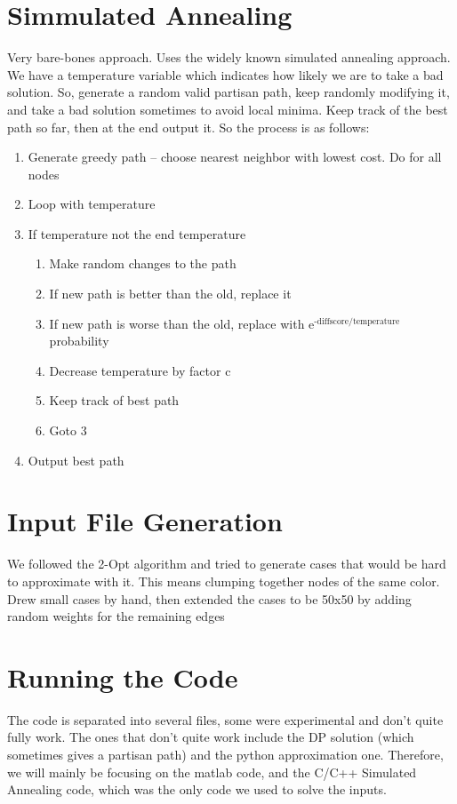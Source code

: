 \documentclass[11pt]{article}
\begin{document}
\section{Simmulated Annealing}
\label{sec-3}
Very bare-bones approach. Uses the widely known simulated annealing approach. We
have a temperature variable which indicates how likely we are to take a bad solution.
So, generate a random valid partisan path, keep randomly modifying it, and take a bad
solution sometimes to avoid local minima. Keep track of the best path so far, then at the
end output it. So the process is as follows:\\
\begin{enumerate}
\item Generate greedy path -- choose nearest neighbor with lowest cost. Do for all nodes
\item Loop with temperature
\item If temperature not the end temperature
\begin{enumerate}
\item Make random changes to the path
\item If new path is better than the old, replace it
\item If new path is worse than the old, replace with e$^{\text{-diffscore/temperature}}$ probability
\item Decrease temperature by factor c
\item Keep track of best path
\item Goto 3
\end{enumerate}
\item Output best path
\end{enumerate}

\newpage

\section{Input File Generation}
\label{sec-4}
We followed the 2-Opt algorithm and tried to generate cases
that would be hard to approximate with it. This means clumping together
nodes of the same color. Drew small cases by hand, then extended the cases
to be 50x50 by adding random weights for the remaining edges

\newpage

\section{Running the Code}
\label{sec-5}
The code is separated into several files, some were experimental and don't quite
fully work. The ones that don't quite work include the DP solution (which sometimes
gives a partisan path) and the python approximation one. Therefore, we will mainly
be focusing on the matlab code, and the C/C++ Simulated Annealing code, which was
the only code we used to solve the inputs.
\end{document}
